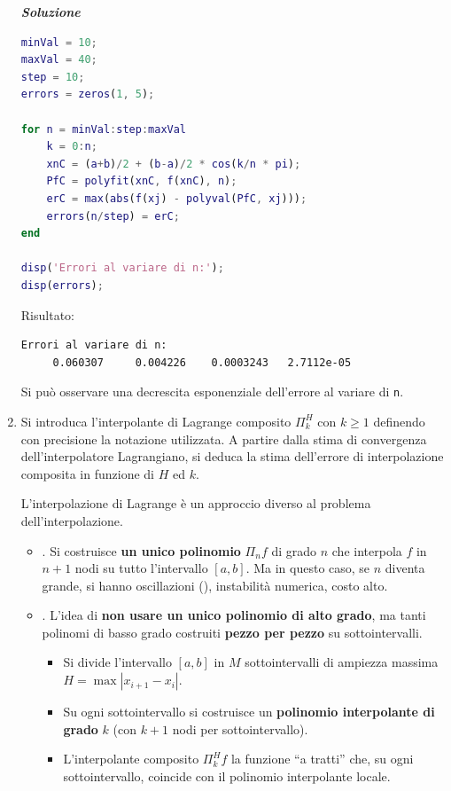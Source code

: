 \begin{enumerate}
    \textcolor{Green3}{\textbf{\emph{Soluzione}}}
    \begin{lstlisting}[language=MATLAB]
minVal = 10;
maxVal = 40;
step = 10;
errors = zeros(1, 5);

for n = minVal:step:maxVal
    k = 0:n;
    xnC = (a+b)/2 + (b-a)/2 * cos(k/n * pi);
    PfC = polyfit(xnC, f(xnC), n);
    erC = max(abs(f(xj) - polyval(PfC, xj)));
    errors(n/step) = erC;
end

disp('Errori al variare di n:');
disp(errors);\end{lstlisting}
    Risultato:
    \begin{lstlisting}
Errori al variare di n:
     0.060307     0.004226    0.0003243   2.7112e-05\end{lstlisting}
    Si può osservare una decrescita esponenziale dell'errore al variare di \texttt{n}.


    \item Si introduca l'interpolante di Lagrange composito $\Pi_{k}^{H}$ con $k \ge 1$ definendo con precisione la notazione utilizzata. A partire dalla stima di convergenza dell'interpolatore Lagrangiano, si deduca la stima dell'errore di interpolazione composita in funzione di $H$ ed $k$.
    
    \begin{remarkbox}
        L'interpolazione di Lagrange è un approccio diverso al problema dell'interpolazione.
        \begin{itemize}
            \item {}. Si costruisce \textbf{un unico polinomio} $\Pi_{n} f$ di grado $n$ che interpola $f$ in $n+1$ nodi su tutto l'intervallo $\left[a,b\right]$. Ma in questo caso, se $n$ diventa grande, si hanno oscillazioni (), instabilità numerica, costo alto.
            
            \item {}. L'idea \eaccent di \textbf{non usare un unico polinomio di alto grado}, ma tanti polinomi di basso grado costruiti \textbf{pezzo per pezzo} su sottointervalli.
            \begin{itemize}
                \item Si divide l'intervallo $\left[a,b\right]$ in $M$ sottointervalli di ampiezza massima $H = \max \left|x_{i + 1} - x_{i}\right|$.
                \item Su ogni sottointervallo si costruisce un \textbf{polinomio interpolante di grado} $k$ (con $k+1$ nodi per sottointervallo).
                \item L'interpolante composito $\Pi_{k}^{H}f$ \eaccent la funzione ``a tratti'' che, su ogni sottointervallo, coincide con il polinomio interpolante locale.
            \end{itemize}


\end{itemize}
\end{remarkbox}
\end{enumerate}
